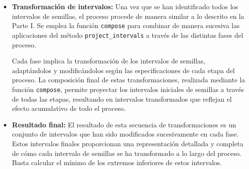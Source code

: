 \documentclass[a4paper,12pt]{article}
\begin{document}
\begin{enumerate}
\begin{itemize}
        \item \textbf{Transformación de intervalos:}
        Una vez que se han identificado todos los intervalos de semillas, el proceso procede de manera similar a lo descrito en la Parte I. Se emplea la función \lstinline{compose} para combinar de manera sucesiva las aplicaciones del método \lstinline{project_intervals} a través de las distintas fases del proceso.
    
        Cada fase implica la transformación de los intervalos de semillas, adaptándolos y modificándolos según las especificaciones de cada etapa del proceso. La composición final de estas transformaciones, realizada mediante la función \lstinline{compose}, permite proyectar los intervalos iniciales de semillas a través de todas las etapas, resultando en intervalos transformados que reflejan el efecto acumulativo de todo el proceso.
    
        \item \textbf{Resultado final:}
        El resultado de esta secuencia de transformaciones es un conjunto de intervalos que han sido modificados sucesivamente en cada fase. Estos intervalos finales proporcionan una representación detallada y completa de cómo cada intervalo de semillas se ha transformado a lo largo del proceso. Basta calcular el mínimo de los extremos inferiores de estos intervalos.
    \end{itemize}
\end{enumerate}    
\end{document}
